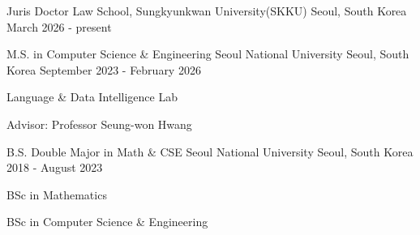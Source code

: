 

\begin{cventries}

%
%
  \cventry
    {Juris Doctor} %
    {Law School, Sungkyunkwan University(SKKU)} %
    {Seoul, South Korea} %
    {March 2026 - present} %
    {}

    \cventry
    {M.S. in Computer Science \& Engineering} %
    {Seoul National University} %
    {Seoul, South Korea} %
    {September 2023 - February 2026} %
    {
        \begin{cvitems} %
          \item {Language \& Data Intelligence Lab}
          \item {Advisor: Professor Seung-won Hwang}
        \end{cvitems}
    }

    \cventry
    {B.S. Double Major in Math \& CSE} %
    {Seoul National University} %
    {Seoul, South Korea} %
    {2018 - August 2023} %
    {
        \begin{cvitems} %
          \item {BSc in Mathematics}
          \item {BSc in Computer Science \& Engineering}
        \end{cvitems}
    }

\end{cventries}
